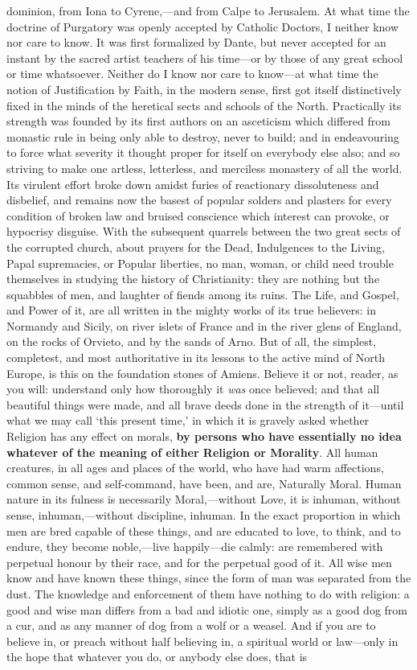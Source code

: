 \begin{quotex}
dominion, from Iona to Cyrene,---and from Calpe to Jerusalem. At what time the doctrine of Purgatory was openly accepted by Catholic Doctors, I neither know nor care to know. It was first formalized by Dante, but never accepted for an instant by the sacred artist teachers of his time---or by those of any great school or time whatsoever. Neither do I know nor care to know---at what time the notion of Justification by Faith, in the modern sense, first got itself distinctively fixed in the minds of the heretical sects and schools of the North. Practically its strength was founded by its first authors on an asceticism which differed from monastic rule in being only able to destroy, never to build; and in endeavouring to force what severity it thought proper for itself on everybody else also; and so striving to make one artless, letterless, and merciless monastery of all the world. Its virulent effort broke down amidst furies of reactionary dissoluteness and disbelief, and remains now the basest of popular solders and plasters for every condition of broken law and bruised conscience which interest can provoke, or hypocrisy disguise. With the subsequent quarrels between the two great sects of the corrupted church, about prayers for the Dead, Indulgences to the Living, Papal supremacies, or Popular liberties, no man, woman, or child need trouble themselves in studying the history of Christianity: they are nothing but the squabbles of men, and laughter of fiends among its ruins. The Life, and Gospel, and Power of it, are all written in the mighty works of its true believers: in Normandy and Sicily, on river islets of France and in the river glens of England, on the rocks of Orvieto, and by the sands of Arno. But of all, the simplest, completest, and most authoritative in its lessons to the active mind of North Europe, is this on the foundation stones of Amiens. Believe it or not, reader, as you will: understand only how thoroughly it \emph{was} once believed; and that all beautiful things were made, and all brave deeds done in the strength of it---until what we may call `this present time,' in which it is gravely asked whether Religion has any effect on morals, \textbf{by persons who have essentially no idea whatever of the meaning of either Religion or Morality}. All human creatures, in all ages and places of the world, who have had warm affections, common sense, and self-command, have been, and are, Naturally Moral. Human nature in its fulness is necessarily Moral,---without Love, it is inhuman, without sense, inhuman,---without discipline, inhuman. In the exact proportion in which men are bred capable of these things, and are educated to love, to think, and to endure, they become noble,---live happily---die calmly: are remembered with perpetual honour by their race, and for the perpetual good of it. All wise men know and have known these things, since the form of man was separated from the dust. The knowledge and enforcement of them have nothing to do with religion: a good and wise man differs from a bad and idiotic one, simply as a good dog from a cur, and as any manner of dog from a wolf or a weasel. And if you are to believe in, or preach without half believing in, a spiritual world or law---only in the hope that whatever you do, or anybody else does, that is 
\end{quotex}
